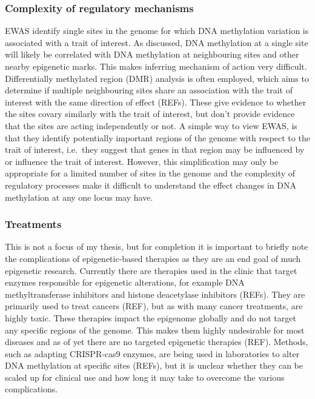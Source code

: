 \documentclass[11pt,twoside]{bristolthesis}
\begin{document}
\hypertarget{complexity-of-regulatory-mechanisms}{%
\subsubsection{Complexity of regulatory mechanisms}\label{complexity-of-regulatory-mechanisms}}

EWAS identify single sites in the genome for which DNA methylation variation is associated with a trait of interest. As discussed, DNA methylation at a single site will likely be correlated with DNA methylation at neighbouring sites and other nearby epigenetic marks. This makes inferring mechanism of action very difficult. Differentially methylated region (DMR) analysis is often employed, which aims to determine if multiple neighbouring sites share an association with the trait of interest with the same direction of effect (REFs). These give evidence to whether the sites covary similarly with the trait of interest, but don't provide evidence that the sites are acting independently or not. A simple way to view EWAS, is that they identify potentially important regions of the genome with respect to the trait of interest, i.e.~they suggest that genes in that region may be influenced by or influence the trait of interest. However, this simplification may only be appropriate for a limited number of sites in the genome and the complexity of regulatory processes make it difficult to understand the effect changes in DNA methylation at any one locus may have.

\hypertarget{treatments}{%
\subsubsection{Treatments}\label{treatments}}

This is not a focus of my thesis, but for completion it is important to briefly note the complications of epigenetic-based therapies as they are an end goal of much epigenetic research. Currently there are therapies used in the clinic that target enzymes responsible for epigenetic alterations, for example DNA methyltransferase inhibitors and histone deacetylase inhibitors (REFs). They are primarily used to treat cancers (REF), but as with many cancer treatments, are highly toxic. These therapies impact the epigenome globally and do not target any specific regions of the genome. This makes them highly undesirable for most diseases and as of yet there are no targeted epigenetic therapies (REF). Methods, such as adapting CRISPR-cas9 enzymes, are being used in laboratories to alter DNA methylation at specific sites (REFs), but it is unclear whether they can be scaled up for clinical use and how long it may take to overcome the various complications.
\end{document}
